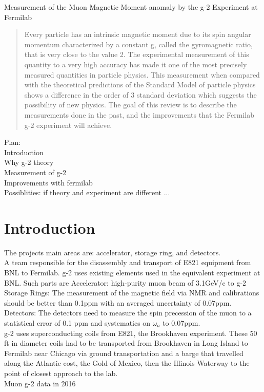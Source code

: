\documentclass[]{article}
\begin{document}
\thispagestyle{empty}
\pagestyle{empty}


\begin{title}
\Large{Measurement of the Muon Magnetic Moment anomaly by the g-2 Experiment at Fermilab}
\end{title}


\begin{abstract}
Every particle has an intrinsic magnetic moment due to its spin angular momentum characterized by a constant g, called the gyromagnetic ratio, that is very close to the value 2. The experimental measurement of this quantity to a very high accuracy has made it one of the most precisely measured quantities in particle physics. This measurement when compared with the theoretical predictions of the Standard Model of particle physics shows a difference in the order of 3 standard deviation which suggests the possibility of new physics. The goal of this review is to describe the measurements done in the past, and the improvements that the Fermilab g-2 experiment will achieve.

\end{abstract}


Plan:\\
Introduction\\
Why g-2 theory\\
Measurement of g-2\\
Improvements with fermilab\\
Possiblities: if theory and experiment are different ... \\


\section*{Introduction}

The projects main areas are: accelerator, storage ring, and detectors.\\
A team responsible for the disassembly and transport of E821 equipment from BNL to Fermilab. g-2 uses existing elements used in the equivalent experiment at BNL. Such parts are 
Accelerator: high-purity muon beam of 3.1GeV/c to g-2\\
Storage Rings: The measurement of the magnetic field via NMR and calibrations should be better than 0.1ppm with an averaged uncertainty of 0.07ppm.  \\
Detectors: The detectors need to measure the spin precession of the muon to a statistical error of 0.1 ppm and systematics on $\omega_a$ to 0.07ppm. \\
g-2 uses superconducting coils from E821, the Brookhaven experiment. These 50 ft in diameter coils had to be transported from Brookhaven in Long Island to Fermilab near Chicago via ground transportation and a barge that travelled along the Atlantic cost, the Gold of Mexico, then the Illinois Waterway to the point of closest approach to the lab.\\
Muon g-2 data in 2016\\
\end{document}
